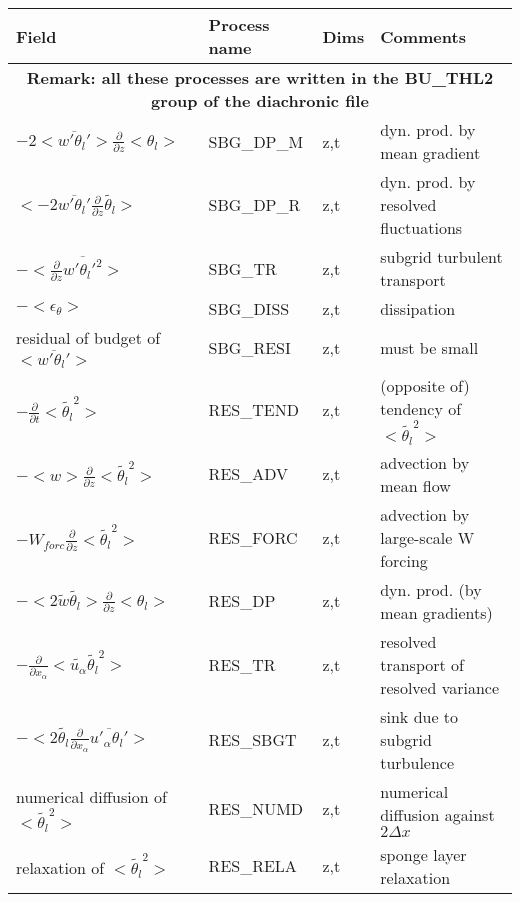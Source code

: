 \begingroup
\renewcommand\arraystretch{1.5}
\begin{longtable}[c]{|p{}|p{}|p{}|p{}|}
\hline
Field & Process name & Dims & Comments \\
\hline \hline
\endhead
\multicolumn{4}{|c|}{\textbf{Remark: all these processes are written in the BU\_THL2 group of the diachronic file}} \\
\hline
\endfoot
$- 2 <\overline{w'\theta_l'}>\frac{\partial }{\partial z}<\theta_l>$     & SBG\_DP\_M & z,t & dyn. prod. by mean gradient \\\hline
$<-2 \overline{w'\theta_l'}\frac{\partial}{\partial z}\tilde{\theta_l}>$ & SBG\_DP\_R & z,t & dyn. prod. by resolved fluctuations\\\hline
$-<\frac{\partial}{\partial z}\overline{w'\theta_l'^2}>$                 & SBG\_TR    & z,t & subgrid turbulent transport\\\hline
$-<\epsilon_\theta>$                                                     & SBG\_DISS  & z,t & dissipation \\\hline
{\rm residual of budget of} $<\overline{w'\theta_l'}>$                   & SBG\_RESI  & z,t & must be small \\\hline
$-\frac{\partial }{\partial t}<\tilde{\theta_l}^2>$                      & RES\_TEND  & z,t & (opposite of) tendency of $<\tilde{\theta_l}^2>$\\\hline
$-<w>\frac{\partial}{\partial z}<\tilde{\theta_l}^2>$                    & RES\_ADV   & z,t & advection by mean flow \\\hline
$-W_{forc}\frac{\partial}{\partial z}<\tilde{\theta_l}^2>$               & RES\_FORC  & z,t & advection by large-scale W forcing \\\hline
$-< 2 \tilde{w}\tilde{\theta_l}>\frac{\partial }{\partial z}<\theta_l>$  & RES\_DP    & z,t & dyn. prod. (by mean gradients) \\\hline
$-\frac{\partial}{\partial x_\alpha} <\tilde{u_\alpha} \tilde{\theta_l}^2>$ & RES\_TR & z,t & resolved transport of resolved variance \\\hline
$- <2 \tilde{\theta_l}\frac{\partial}{\partial x_\alpha}\overline{u'_\alpha \theta_l'}>$ & RES\_SBGT & z,t & sink due to subgrid turbulence \\\hline
{\rm numerical diffusion of } $<\tilde{\theta_l}^2>$                     & RES\_NUMD  & z,t & numerical diffusion against $2\Delta x$ \\\hline
{\rm relaxation of }$<\tilde{\theta_l}^2>$                               & RES\_RELA  & z,t & sponge layer relaxation \\\hline

\end{longtable}
